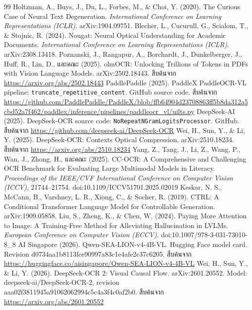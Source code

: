 \begin{thebibliography}{99}
 Holtzman, A., Buys, J., Du, L., Forbes, M., \& Choi, Y. (2020). The Curious Case of Neural Text Degeneration. \textit{International Conference on Learning Representations (ICLR)}. arXiv:1904.09751.
 Blecher, L., Cucurull, G., Scialom, T., \& Stojnic, R. (2024). Nougat: Neural Optical Understanding for Academic Documents. \textit{International Conference on Learning Representations (ICLR)}. arXiv:2308.13418.
 Poznanski, J., Rangapur, A., Borchardt, J., Dunkelberger, J., Huff, R., Lin, D., และคณะ (2025). olmOCR: Unlocking Trillions of Tokens in PDFs with Vision Language Models. arXiv:2502.18443. สืบค้นจาก \url{https://arxiv.org/abs/2502.18443}
 PaddlePaddle (2025). PaddleX PaddleOCR-VL pipeline: \texttt{truncate\_repetitive\_content}. GitHub source code. สืบค้นจาก \url{https://github.com/PaddlePaddle/PaddleX/blob/ffb64904d23708863ff5b8da312a5cbd52a7f462/paddlex/inference/pipelines/paddleocr_vl/uilts.py}
 DeepSeek-AI (2025). DeepSeek-OCR source code: \texttt{NoRepeatNGramLogitsProcessor}. GitHub. สืบค้นจาก \url{https://github.com/deepseek-ai/DeepSeek-OCR}
 Wei, H., Sun, Y., \& Li, Y. (2025). DeepSeek-OCR: Contexts Optical Compression. arXiv:2510.18234. สืบค้นจาก \url{https://arxiv.org/abs/2510.18234}
 Yang, Z., Tang, J., Li, Z., Wang, P., Wan, J., Zhong, H., และคณะ (2025). CC-OCR: A Comprehensive and Challenging OCR Benchmark for Evaluating Large Multimodal Models in Literacy. \textit{Proceedings of the IEEE/CVF International Conference on Computer Vision (ICCV)}, 21744–21754. doi:10.1109/ICCV51701.2025.02019
 Keskar, N. S., McCann, B., Varshney, L. R., Xiong, C., \& Socher, R. (2019). CTRL: A Conditional Transformer Language Model for Controllable Generation. arXiv:1909.05858.
 Liu, S., Zheng, K., \& Chen, W. (2024). Paying More Attention to Image: A Training-Free Method for Alleviating Hallucination in LVLMs. \textit{European Conference on Computer Vision (ECCV)}. doi:10.1007/978-3-031-73010-8\_8
 AI Singapore (2026). Qwen-SEA-LION-v4-4B-VL. Hugging Face model card. Revision d0734aa1b8113fce90997a83c1e4afe2c37c6205. สืบค้นจาก \url{https://huggingface.co/aisingapore/Qwen-SEA-LION-v4-4B-VL}
 Wei, H., Sun, Y., \& Li, Y. (2026). DeepSeek-OCR 2: Visual Causal Flow. arXiv:2601.20552. Model: deepseek-ai/DeepSeek-OCR-2, revision aaa02f3811945a91062062994c5c4a3f4c0af2b0. สืบค้นจาก \url{https://arxiv.org/abs/2601.20552}
\end{thebibliography}
